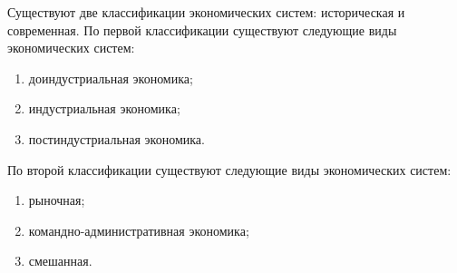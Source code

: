 Существуют две классификации экономических систем: историческая и современная.
По первой классификации существуют следующие виды экономических систем:
\begin{enumerate}
    \item доиндустриальная экономика;
    \item индустриальная экономика;
    \item постиндустриальная экономика.
\end{enumerate}

По второй классификации существуют следующие виды экономических систем:
\begin{enumerate}
    \item рыночная;
    \item командно-административная экономика;
    \item смешанная.
\end{enumerate}
